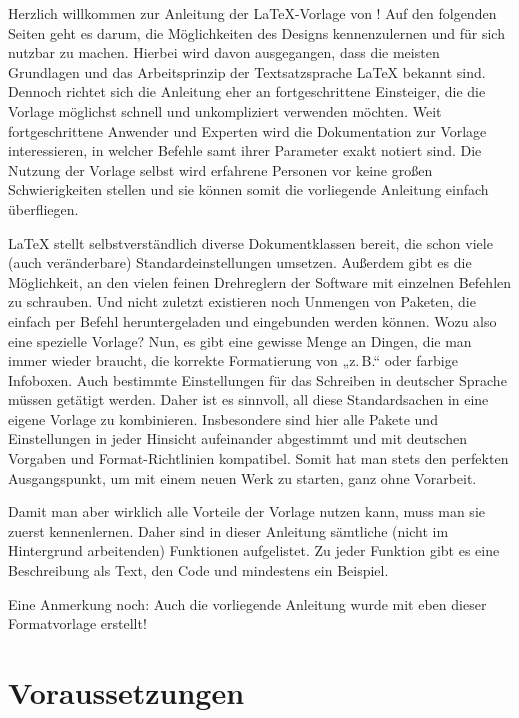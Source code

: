 			Herzlich willkommen zur Anleitung der \LaTeX{}-Vorlage von ! Auf den folgenden Seiten geht es darum, die Möglichkeiten des Designs kennenzulernen und für sich nutzbar zu machen. Hierbei wird davon ausgegangen, dass die meisten Grundlagen und das Arbeitsprinzip der Textsatzsprache \LaTeX{} bekannt sind. Dennoch richtet sich die Anleitung eher an fortgeschrittene Einsteiger, die die Vorlage möglichst schnell und unkompliziert verwenden möchten. Weit fortgeschrittene Anwender und Experten wird die Dokumentation zur Vorlage interessieren, in welcher Befehle samt ihrer Parameter exakt notiert sind. Die Nutzung der Vorlage selbst wird erfahrene Personen vor keine großen Schwierigkeiten stellen und sie können somit die vorliegende Anleitung einfach überfliegen.

			\LaTeX{} stellt selbstverständlich diverse Dokumentklassen bereit, die schon viele (auch veränderbare) Standardeinstellungen umsetzen. Außerdem gibt es die Möglichkeit, an den vielen feinen Drehreglern der Software mit einzelnen Befehlen zu schrauben. Und nicht zuletzt existieren noch Unmengen von Paketen, die einfach per Befehl heruntergeladen und eingebunden werden können. Wozu also eine spezielle Vorlage? Nun, es gibt eine gewisse Menge an Dingen, die man immer wieder braucht, \zb die korrekte Formatierung von „z.\,B.“ oder farbige Infoboxen. Auch bestimmte Einstellungen für das Schreiben in deutscher Sprache müssen getätigt werden. Daher ist es sinnvoll, all diese Standardsachen in eine eigene Vorlage zu kombinieren. Insbesondere sind hier alle Pakete und Einstellungen in jeder Hinsicht aufeinander abgestimmt und mit deutschen Vorgaben und Format-Richtlinien kompatibel. Somit hat man stets den perfekten Ausgangspunkt, um mit einem neuen Werk zu starten, ganz ohne Vorarbeit.

			Damit man aber wirklich alle Vorteile der Vorlage nutzen kann, muss man sie zuerst kennenlernen. Daher sind in dieser Anleitung sämtliche (nicht im Hintergrund arbeitenden) Funktionen aufgelistet. Zu jeder Funktion gibt es eine Beschreibung als Text, den Code und mindestens ein Beispiel.

			Eine Anmerkung noch: Auch die vorliegende Anleitung wurde mit eben dieser Formatvorlage erstellt!

		\section{Voraussetzungen}


